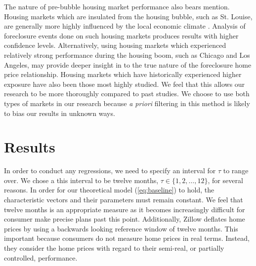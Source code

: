 \documentclass[12pt,oneside]{amsbook}
\begin{document}
	The nature of pre-bubble housing market performance also bears mention. Housing markets which are insulated from the housing bubble, such as St. Louise, are generally more highly influenced by the local economic climate \cite{Impact}. Analysis of foreclosure events done on such housing markets produces results with higher confidence levels. Alternatively, using housing markets which experienced relatively strong performance during the housing boom, such as Chicago and Los Angeles, may provide deeper insight in to the true nature of the foreclosure home price relationship. Housing markets which have historically experienced higher exposure have also been those most highly studied. We feel that this allows our research to be more thoroughly compared to past studies. We choose to use both types of markets in our research because \textit{a priori} filtering in this method is likely to bias our results in unknown ways. 



\section{Results}
    In order to conduct any regressions, we need to specify an interval for $\tau$ to range over. We chose a this interval to be twelve months, $\tau \in \{1, 2, \dots, 12\}$, for several reasons. In order for our theoretical model (\ref{eq:baseline}) to hold, the characteristic vectors and their parameters must remain constant. We feel that twelve months is an appropriate measure as it becomes increasingly difficult for consumer make precise plans past this point. Additionally, Zillow deflates home prices by using a backwards looking reference window of twelve months. This important because consumers do not measure home prices in real terms. Instead, they consider the home prices with regard to their semi-real, or partially controlled, performance. \\
    
\end{document}
